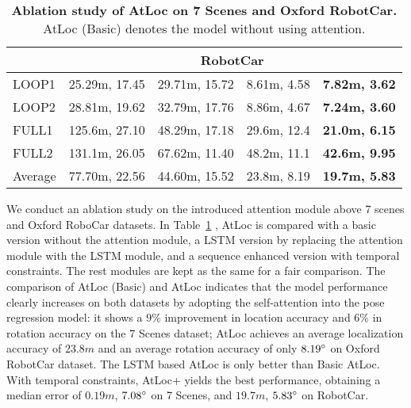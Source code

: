 \documentclass[letterpaper]{article}
\begin{document}
\begin{table}[t]
{\begin{tabular}{l|cccc}
\multicolumn{1}{c|}{} & \multicolumn{4}{c}{RobotCar}                                                                                                                                    \\ \hline
LOOP1                 & 25.29m, 17.45                                         & 29.71m, 15.72                                              & 8.61m, 4.58          & \textbf{7.82m, 3.62} \\
LOOP2                 & 28.81m, 19.62                                         & 32.79m, 17.76                                              & 8.86m, 4.67          & \textbf{7.24m, 3.60} \\
FULL1                 & 125.6m, 27.10                                         & 48.29m, 17.18                                              & 29.6m, 12.4          & \textbf{21.0m, 6.15} \\
FULL2                 & 131.1m, 26.05                                         & 67.62m, 11.40                                              & 48.2m, 11.1          & \textbf{42.6m, 9.95} \\ \hline
Average               & 77.70m, 22.56                                         & 44.60m, 15.52                                              & 23.8m, 8.19          & \textbf{19.7m, 5.83}
\end{tabular}
}
\caption{\textbf{Ablation study of AtLoc on 7 Scenes and Oxford RobotCar.} AtLoc (Basic) denotes the model without using attention. }
	\label{tbl:ablation}
    \vspace{-0.5cm}
\end{table}

We conduct an ablation study on the introduced attention module above 7 scenes and Oxford RoboCar datasets.
In Table~\ref{tbl:ablation} , AtLoc is compared with a basic version without the attention module, a LSTM version by replacing the attention module with the LSTM module, and a sequence enhanced version with temporal constraints. The rest modules are kept as the same for a fair comparison.
The comparison of AtLoc (Basic) and AtLoc indicates that the model performance clearly increases on both datasets by adopting the self-attention into the pose regression model: it shows a $9\%$ improvement in location accuracy and $6\%$ in rotation accuracy on the 7 Scenes dataset; AtLoc achieves an average localization accuracy of $23.8m$ and an average rotation accuracy of only $8.19\degree$ on Oxford RobotCar dataset. The LSTM based AtLoc is only better than Basic AtLoc. With temporal constraints, AtLoc+ yields the best performance, obtaining a median error of $0.19m$, $7.08\degree$ on 7 Scenes, and $19.7m$, $5.83\degree$ on RobotCar.
\end{document}
